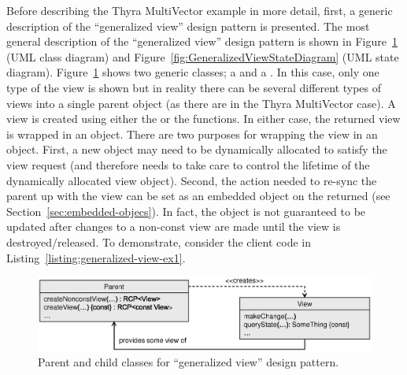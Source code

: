 \documentclass[pdf,ps2pdf,11pt]{SANDreport}
\begin{document}
Before describing the Thyra MultiVector example in more detail, first,
a generic description of the ``generalized view'' design pattern is
presented.  The most general description of the ``generalized view''
design pattern is shown in
Figure~\ref{fig:GeneralizedViewClassDiagram} (UML class diagram) and
Figure~\ref{fig:GeneralizedViewStateDiagram} (UML state diagram).
Figure~\ref{fig:GeneralizedViewClassDiagram} shows two generic
classes; a {} and a {}.  In this case, only one
type of the view is shown but in reality there can be several
different types of views into a single parent object (as there are in
the Thyra MultiVector case).  A view is created using either the
{} or the {} 
functions.  In either case, the returned view is wrapped in an
{} object.  There are two purposes for wrapping the view in
an {} object.  First, a new {} object may need to
be dynamically allocated to satisfy the view request (and therefore
needs {} to take care to control the lifetime of the
dynamically allocated view object).  Second, the action needed to
re-sync the parent up with the view can be set as an embedded object
on the returned {} (see Section~\ref{sec:embedded-objecs}).
In fact, the {} object is not guaranteed to be updated
after changes to a non-const view are made until the view is
destroyed/released.  To demonstrate, consider the client code in
Listing~\ref{listing:generalized-view-ex1}.


{\bsinglespace
\begin{figure}[p]
\begin{center}
\includegraphics*[angle=0,scale=0.65]{GeneralizedViewClassDiagram}
\end{center}
\caption{
\label{fig:GeneralizedViewClassDiagram}
Parent and child classes for ``generalized view'' design pattern.}
\end{figure}
\esinglespace}
\end{document}
